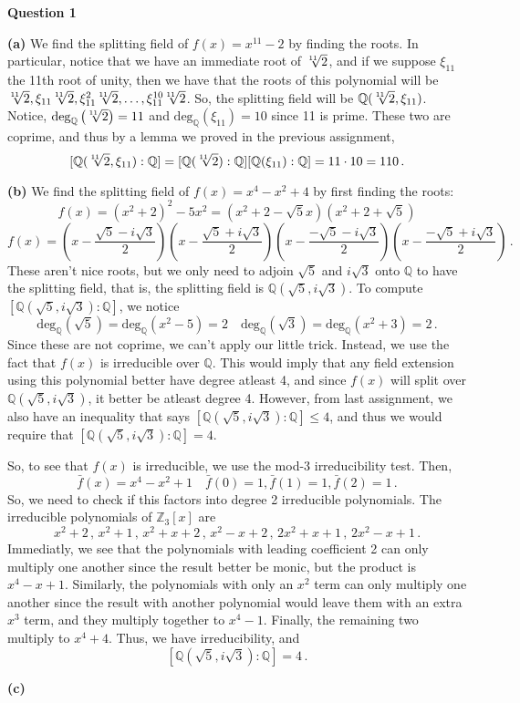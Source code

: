 \documentclass[10pt]{article}
\newcommand{\Z}{\mathbb{Z}}
\newcommand{\Q}{\mathbb{Q}}
\begin{document}
\textbf{Question 1}

\textbf{(a)} We find the splitting field of $f(x) = x^{11} - 2$ by finding the roots. In particular, notice that we have an immediate root of $\sqrt[\leftroot{1}\uproot{0}11]{2}$, and if we suppose $\xi_{11}$ the 11th root of unity, then we have that the roots of this polynomial will be $\sqrt[\leftroot{1}\uproot{0}11]{2}, \xi_{11}\sqrt[\leftroot{1}\uproot{0}11]{2}, \xi_{11}^{2}\sqrt[\leftroot{1}\uproot{0}11]{2}, \dots, \xi_{11}^{10}\sqrt[\leftroot{1}\uproot{0}11]{2}$. So, the splitting field will be $\Q(\sqrt[\leftroot{1}\uproot{0}11]{2}, \xi_{11})$. Notice, $\text{deg}_{\Q}\left(\sqrt[\leftroot{1}\uproot{0}11]{2}\right) = 11$ and $\text{deg}_{\Q}(\xi_{11}) = 10$ since 11 is prime. These two are coprime, and thus by a lemma we proved in the previous assignment,
\[ [\Q(\sqrt[\leftroot{1}\uproot{0}11]{2},\xi_{11}): \Q] = [\Q(\sqrt[\leftroot{1}\uproot{0}11]{2}):\Q][\Q(\xi_{11}):\Q] = 11\cdot 10 = 110\, .\]

\textbf{(b)} We find the splitting field of $f(x) = x^{4} - x^{2} + 4$ by first finding the roots:
\[ f(x) = (x^{2} + 2)^{2} - 5x^{2} = (x^{2} + 2 - \sqrt{5}x)(x^{2} + 2 + \sqrt{5})\]
\[ f(x) = \left(x - \frac{\sqrt{5} - i\sqrt{3}}{2}\right) \left(x - \frac{\sqrt{5} + i\sqrt{3}}{2}\right) \left(x - \frac{-\sqrt{5} - i\sqrt{3}}{2}\right) \left(x - \frac{-\sqrt{5} + i\sqrt{3}}{2}\right)\, .\]
These aren't nice roots, but we only need to adjoin $\sqrt{5}$ and $i\sqrt{3}$ onto $\Q$ to have the splitting field, that is, the splitting field is $\Q(\sqrt{5},i\sqrt{3})$. To compute $[\Q(\sqrt{5},i\sqrt{3}):\Q]$, we notice
\[ \text{deg}_{\Q}(\sqrt{5}) = \text{deg}_{\Q}(x^{2} - 5) = 2 \quad \text{deg}_{\Q}(\sqrt{3}) = \text{deg}_{\Q}(x^{2} + 3) = 2\, .\]
Since these are not coprime, we can't apply our little trick. Instead, we use the fact that $f(x)$ is irreducible over $\Q$. This would imply that any field extension using this polynomial better have degree atleast 4, and since $f(x)$ will split over $\Q(\sqrt{5},i\sqrt{3})$, it better be atleast degree 4. However, from last assignment, we also have an inequality that says $[\Q(\sqrt{5},i\sqrt{3}):\Q] \leq 4$, and thus we would require that $[\Q(\sqrt{5},i\sqrt{3}):\Q] = 4$.

So, to see that $f(x)$ is irreducible, we use the mod-3 irreducibility test. Then,
\[ \bar{f}(x) = x^{4} - x^{2} + 1 \quad \bar{f}(0) = 1,\bar{f}(1) = 1, \bar{f}(2) = 1 \, .\]
So, we need to check if this factors into degree 2 irreducible polynomials. The irreducible polynomials of $\Z_{3}[x]$ are
\[ x^{2}+2\, ,\, x^{2}+1\, , \, x^{2}+x+2\, ,\, x^{2}-x+2\,,\,2x^{2}+x+1\,,\,2x^{2}-x+1 \, .\]
Immediatly, we see that the polynomials with leading coefficient 2 can only multiply one another since the result better be monic, but the product is $x^{4} - x + 1$. Similarly, the polynomials with only an $x^{2}$ term can only multiply one another since the result with another polynomial would leave them with an extra $x^{3}$ term, and they multiply together to $x^{4} - 1$. Finally, the remaining two multiply to $x^{4} + 4$. Thus, we have irreducibility, and
\[ [\Q(\sqrt{5},i\sqrt{3}):\Q] = 4\, .\]

\textbf{(c)} 
\end{document}
